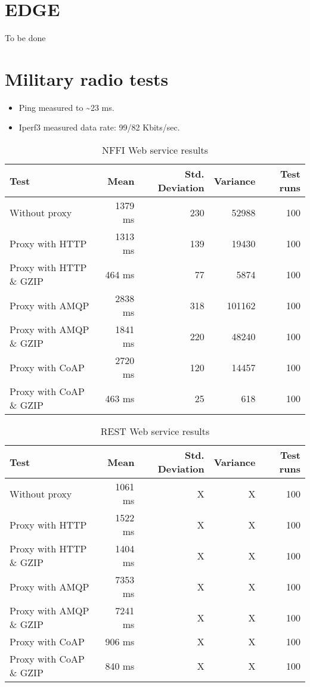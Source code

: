 \begin{appendices}
\section{EDGE}

To be done



\section{Military radio tests}

\begin{itemize}
	\item Ping measured to \textasciitilde 23 ms.
	\item Iperf3 measured data rate: 99/82 Kbits/sec.
\end{itemize}

\begin{table}[H]
\begin{tabular}{| l | r | r | r | r |}
\hline
  \textbf{Test} & \textbf{Mean} & \textbf{Std. Deviation} & \textbf{Variance} & \textbf{Test runs}\\ \hline
  Without proxy & 1379 ms & 230 & 52988 & 100 \\ \hline
  Proxy with HTTP & 1313 ms & 139 & 19430 & 100 \\ \hline
  Proxy with HTTP \& GZIP & 464 ms & 77 & 5874 & 100 \\ \hline
  Proxy with AMQP & 2838 ms & 318 & 101162 & 100 \\ \hline
  Proxy with AMQP \& GZIP & 1841 ms & 220 & 48240 & 100\\ \hline
  Proxy with CoAP & 2720 ms & 120 & 14457 & 100 \\ \hline
  Proxy with CoAP \& GZIP & 463 ms & 25 & 618 & 100 \\ \hline
\end{tabular}
\caption{NFFI Web service results}
\end{table}


\begin{table}[H]
\begin{tabular}{| l | r | r | r | r |}
\hline
  \textbf{Test} & \textbf{Mean} & \textbf{Std. Deviation} & \textbf{Variance} & \textbf{Test runs}\\ \hline
  Without proxy & 1061 ms & X & X & 100 \\ \hline
  Proxy with HTTP & 1522 ms & X & X & 100 \\ \hline
  Proxy with HTTP \& GZIP & 1404 ms & X & X & 100 \\ \hline
  Proxy with AMQP & 7353 ms & X & X & 100 \\ \hline
  Proxy with AMQP \& GZIP & 7241 ms & X & X & 100\\ \hline
  Proxy with CoAP & 906 ms & X & X & 100 \\ \hline
  Proxy with CoAP \& GZIP & 840 ms & X & X & 100 \\ \hline
\end{tabular}
\caption{REST Web service results}
\end{table}



\end{appendices}
